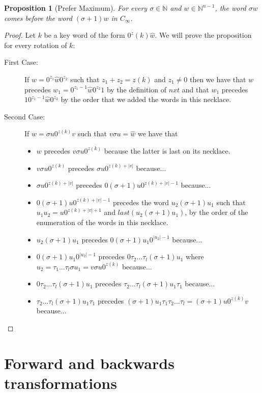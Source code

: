 \documentclass{article}
\newtheorem{proposition}[theorem]{Proposition}
\theoremstyle{definition}
\newcommand{\N}{{\mathbb{N}}}
\begin{document}
\begin{proposition}[Prefer Maximum]
For every $\sigma \in \N$ and $w \in \N^{n-1}$, the word $\sigma w$ comes before the word $(\sigma+1) w$ in $C_\infty$.
\end{proposition}
\begin{proof}
Let $k$ be a key word  of the form $0^z(k)\hat{w}$. We will prove the proposition for every rotation of $k$:


\begin{description} 
\item [First Case:] If $w=0^{z_1}\hat{w}0^{z_2}$ such that $z_1+z_2=z(k)$ and $z_1 \neq 0$ then we have that $w$ precedes  $w_1=0^{z_1-1}\hat{w}0^{z_2}1$ by the definition of $nxt$ and that $w_1$ precedes $1 0^{z_1-1}\hat{w}0^{z_2}$ by the order that we added the words in this necklace.
\item [Second Case:] If $w=\sigma u 0^{z(k)}v$ such that $v\sigma u=\hat{w}$ we have that
\begin{itemize}
	\item $w$ precedes $v \sigma u 0^{z(k)}$ because the latter is last on its necklace.
	\item $v \sigma u 0^{z(k)}$ precedes $\sigma u 0^{z(k)+|v|}$ because...
	\item $\sigma u 0^{z(k)+|v|}$ precedes $0(\sigma+1) u 0^{z(k)+|v|-1}$ because...
	\item $0(\sigma+1) u 0^{z(k)+|v|-1}$ precedes the word $u_2 (\sigma+1) u_1$ such that $u_1u_2=u0^{z(k)+|v|+1}$ and $last(u_2 (\sigma+1) u_1)$, by the order of the enumeration of the words in this necklace.
	\item $u_2 (\sigma+1) u_1$ precedes $0(\sigma+1)u_1 0^{|u_2|-1}$ because...
	\item $0(\sigma+1)u_1 0^{|u_2|-1}$ precedes $0 \tau_2 \dots \tau_l (\sigma+1)u_1$ where $u_2=\tau_1\dots\tau_l \sigma u_1=v\sigma u 0^{z(k)}$ because... 
	\item $0 \tau_2 \dots \tau_l (\sigma+1)u_1$ precedes $\tau_2 \dots \tau_l (\sigma+1)u_1\tau_1$ because... 
	\item $\tau_2 \dots \tau_l (\sigma+1)u_1\tau_1$ precedes $(\sigma+1)u_1\tau_1 \tau_2 \dots \tau_l=(\sigma+1) u 0^{z(k)}v$ because... 
\end{itemize}
\end{description}
 
\end{proof}
 


	
\section{Forward and backwards transformations}
\end{document}
